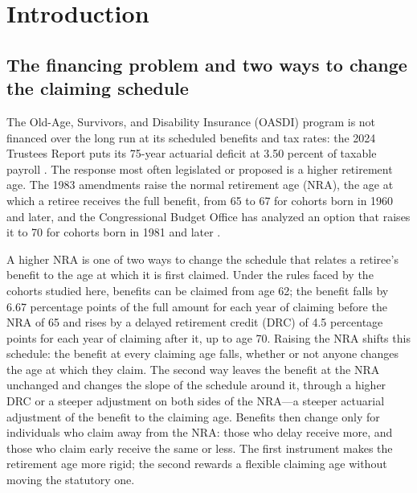 \section{Introduction}\label{sec:intro}

\subsection{The financing problem and two ways to change the claiming schedule}\label{subsec:financing}

The Old-Age, Survivors, and Disability Insurance (OASDI) program is not financed over the long run at its scheduled benefits and tax rates: the 2024 Trustees Report puts its 75-year actuarial deficit at 3.50 percent of taxable payroll \citep{trustees2024}. %
The response most often legislated or proposed is a higher retirement age. The 1983 amendments raise the normal retirement age (NRA), the age at which a retiree receives the full benefit, from 65 to 67 for cohorts born in 1960 and later, and the Congressional Budget Office has analyzed an option that raises it to 70 for cohorts born in 1981 and later \citep{cbo2024socialsecurity}. %

A higher NRA is one of two ways to change the schedule that relates a retiree's benefit to the age at which it is first claimed. Under the rules faced by the cohorts studied here, benefits can be claimed from age 62; the benefit falls by 6.67 percentage points of the full amount for each year of claiming before the NRA of 65 and rises by a delayed retirement credit (DRC) of 4.5 percentage points for each year of claiming after it, up to age 70. %
Raising the NRA shifts this schedule: the benefit at every claiming age falls, whether or not anyone changes the age at which they claim. The second way leaves the benefit at the NRA unchanged and changes the slope of the schedule around it, through a higher DRC or a steeper adjustment on both sides of the NRA---a steeper actuarial adjustment of the benefit to the claiming age. Benefits then change only for individuals who claim away from the NRA: those who delay receive more, and those who claim early receive the same or less. The first instrument makes the retirement age more rigid; the second rewards a flexible claiming age without moving the statutory one.

